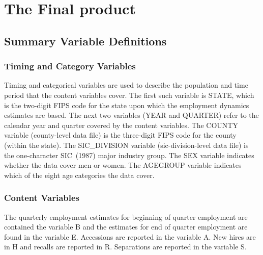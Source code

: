 \section{The Final product}
\label{sec:final}

\subsection{Summary Variable Definitions}

\subsubsection{Timing and Category Variables}

 

Timing and categorical variables are used to describe the population and
time period that the content variables cover. The first such variable is 
\textsf{STATE}, which is the two-digit FIPS%
 code for the state upon which the employment dynamics estimates
are based. The next two variables (\textsf{YEAR} and \textsf{%
QUARTER}) refer to the calendar year and quarter covered by
the content variables. The \textsf{COUNTY} variable
(county-level data file) is the three-digit FIPS%
 code for the county (within the state). The \textsf{%
SIC\_DIVISION} variable (sic-division-level data file)
is the one-character SIC\ (1987) major industry group. The \textsf{SEX}%
 variable indicates whether the data cover men or women. The 
\textsf{AGEGROUP} variable indicates which of the eight age
categories the data cover.

\subsubsection{Content Variables}

 

The quarterly employment estimates for beginning of quarter employment are
contained the variable \textsf{B} and the estimates for end of quarter
employment are found in the variable \textsf{E}. Accessions are reported in
the variable \textsf{A}. New hires are in \textsf{H} and recalls are
reported in \textsf{R}. Separations are reported in the variable \textsf{S}.

